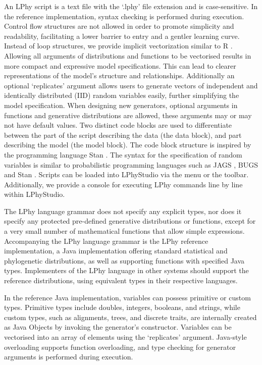 \documentclass[10pt,letterpaper,table]{article}
\theoremstyle{definition}
\begin{document}
An LPhy script is a text file with the `.lphy' file extension and is case-sensitive. 
In the reference implementation, syntax checking is performed during execution. 
Control flow structures are not allowed in order to promote simplicity and readability, facilitating a lower barrier to entry and a gentler learning curve. 
Instead of loop structures, we provide implicit vectorization similar to R \cite{ihaka1996r}. Allowing all arguments of distributions and functions to be vectorised results in more compact and expressive model specifications. 
This can lead to clearer representations of the model's structure and relationships. Additionally an optional `replicates' argument allows users to generate vectors of independent and identically distributed (IID) random variables easily, further simplifying the model specification.
When designing new generators, optional arguments in functions and generative distributions are allowed, these arguments may or may not have default values. 
Two distinct code blocks are used to differentiate between the part of the script describing the data (the data block), and part describing the model (the model block). 
The code block structure is inspired by the programming language Stan \cite{carpenter2017stan}. 
The syntax for the specification of random variables is similar to probabilistic programming languages such as JAGS \cite{plummer2004jags}, BUGS \cite{lunn2009bugs, gilks1994language} and Stan \cite{carpenter2017stan}.
Scripts can be loaded into LPhyStudio via the menu or the toolbar. 
Additionally, we provide a console for executing LPhy commands line by line within LPhyStudio. 

The LPhy language grammar does not specify any explicit types, nor does it specify any protected pre-defined generative distributions or functions, except for a very small number of mathematical functions that allow simple expressions. 
Accompanying the LPhy language grammar is the LPhy reference implementation, a Java implementation offering standard statistical and phylogenetic distributions, as well as supporting functions with specified Java types.
Implementers of the LPhy language in other systems should support the reference distributions, using equivalent types in their respective languages.

In the reference Java implementation, variables can possess primitive or custom types. 
Primitive types include doubles, integers, booleans, and strings, while custom types, such as alignments, trees, and discrete traits, are internally created as Java Objects by invoking the generator's constructor. 
Variables can be vectorised into an array of elements using the `replicates' argument. 
Java-style overloading supports function overloading, and type checking for generator arguments is performed during execution.
\end{document}
